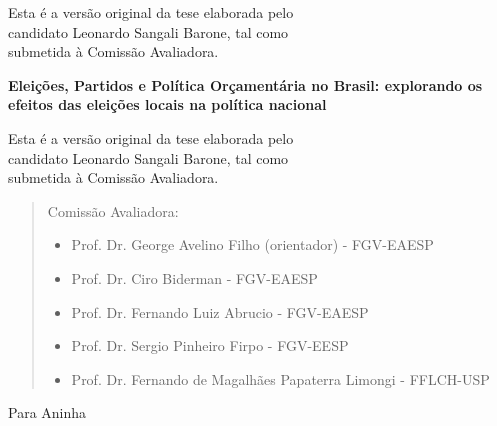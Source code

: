 \documentclass[12pt,twoside,a4paper]{book}
\begin{document}
    \begin{flushright}
	Esta é a versão original da tese elaborada pelo\\
	candidato Leonardo Sangali Barone, tal como \\
	submetida à Comissão Avaliadora.
    \end{flushright}

\pagebreak
\newpage
\thispagestyle{empty}
    \begin{center}
        \vspace*{2.3 cm}
        \textbf{\Large{Eleições, Partidos e Política Orçamentária no Brasil: explorando os efeitos das eleições locais na política nacional}}\\
        \vspace*{2 cm}
    \end{center}

    \vskip 2cm

    \begin{flushright}
    Esta é a versão original da tese elaborada pelo\\
    candidato Leonardo Sangali Barone, tal como \\
    submetida à Comissão Avaliadora.

    \vskip 2cm

    \end{flushright}
    \vskip 4.2cm

    \begin{quote}
    \noindent Comissão Avaliadora:
    
    \begin{itemize}
		\item Prof. Dr. George Avelino Filho (orientador) - FGV-EAESP
		\item Prof. Dr. Ciro Biderman - FGV-EAESP
		\item Prof. Dr. Fernando Luiz Abrucio - FGV-EAESP
        \item Prof. Dr. Sergio Pinheiro Firpo - FGV-EESP
        \item Prof. Dr. Fernando de Magalhães Papaterra Limongi - FFLCH-USP
    \end{itemize}
      
    \end{quote}

\pagebreak

\newpage
\thispagestyle{empty}

    \vspace*{17 cm}

    \begin{flushright}
    Para Aninha
    \end{flushright}
\end{document}
